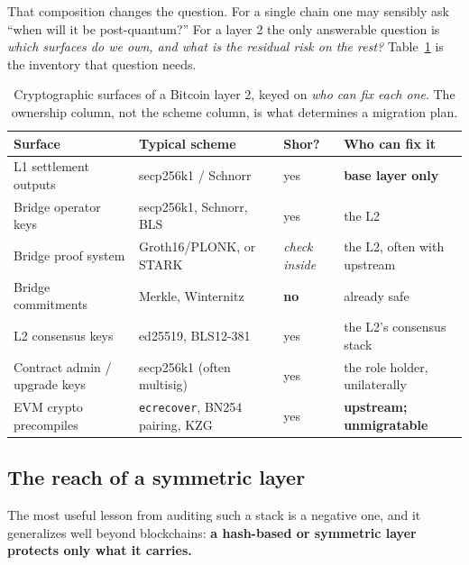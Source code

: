 That composition changes the question. For a single chain one may sensibly ask
``when will it be post-quantum?'' For a layer 2 the only answerable question is
\emph{which surfaces do we own, and what is the residual risk on the rest?}
Table~\ref{tab:l2-surfaces} is the inventory that question needs.

\begin{table}[H]
\centering
\small
\begin{tabular}{@{}p{3.6cm}p{4.3cm}p{2.0cm}p{3.6cm}@{}}
\toprule
Surface & Typical scheme & Shor? & Who can fix it \\
\midrule
L1 settlement outputs & secp256k1 / Schnorr & yes & \textbf{base layer only} \\
Bridge operator keys & secp256k1, Schnorr, BLS & yes & the L2 \\
Bridge proof system & Groth16/PLONK, or STARK & \emph{check inside} & the L2, often with upstream \\
Bridge commitments & Merkle, Winternitz & \textbf{no} & already safe \\
L2 consensus keys & ed25519, BLS12-381 & yes & the L2's consensus stack \\
Contract admin / upgrade keys & secp256k1 (often multisig) & yes & the role holder, unilaterally \\
EVM crypto precompiles & \texttt{ecrecover}, BN254 pairing, KZG & yes & \textbf{upstream; unmigratable} \\
\bottomrule
\end{tabular}
\caption{Cryptographic surfaces of a Bitcoin layer 2, keyed on \emph{who can fix each one}. The ownership column, not the scheme column, is what determines a migration plan.}
\label{tab:l2-surfaces}
\end{table}

\subsection{The reach of a symmetric layer}
\label{sec:symmetric-plumbing}
The most useful lesson from auditing such a stack is a negative one, and it
generalizes well beyond blockchains: \textbf{a hash-based or symmetric layer
protects only what it carries.}


